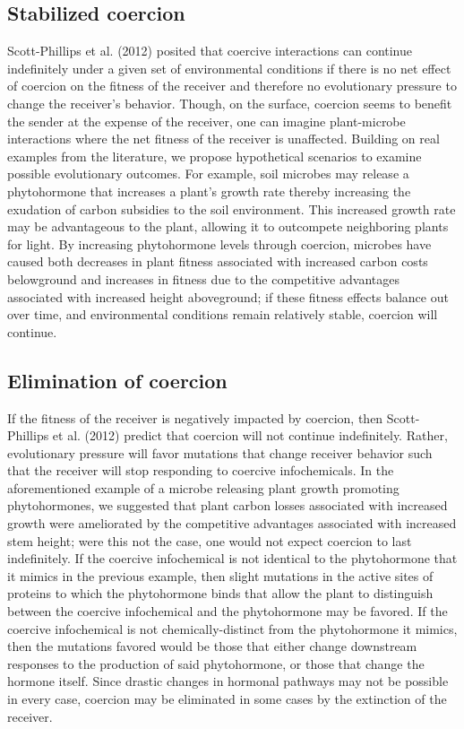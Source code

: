 \subsection{Stabilized coercion}
Scott-Phillips et al. (2012) posited that coercive interactions can continue indefinitely under a given set of environmental conditions if there is no net effect of coercion on the fitness of the receiver and therefore no evolutionary pressure to change the receiver’s behavior. Though, on the surface, coercion seems to benefit the sender at the expense of the receiver, one can imagine plant-microbe interactions where the net fitness of the receiver is unaffected. Building on real examples from the literature, we propose hypothetical scenarios to examine possible evolutionary outcomes. For example, soil microbes may release a phytohormone that increases a plant’s growth rate thereby increasing the exudation of carbon subsidies to the soil environment. This increased growth rate may be advantageous to the plant, allowing it to outcompete neighboring plants for light. By increasing phytohormone levels through coercion, microbes have caused both decreases in plant fitness associated with increased carbon costs belowground and increases in fitness due to the competitive advantages associated with increased height aboveground; if these fitness effects balance out over time, and environmental conditions remain relatively stable, coercion will continue.

\subsection{Elimination of coercion}
If the fitness of the receiver is negatively impacted by coercion, then Scott-Phillips et al. (2012) predict that coercion will not continue indefinitely. Rather, evolutionary pressure will favor mutations that change receiver behavior such that the receiver will stop responding to coercive infochemicals. In the aforementioned example of a microbe releasing plant growth promoting phytohormones, we suggested that plant carbon losses associated with increased growth were ameliorated by the competitive advantages associated with increased stem height; were this not the case, one would not expect coercion to last indefinitely. If the coercive infochemical is not identical to the phytohormone that it mimics in the previous example, then slight mutations in the active sites of proteins to which the phytohormone binds that allow the plant to distinguish between the coercive infochemical and the phytohormone may be favored. If the coercive infochemical is not chemically-distinct from the phytohormone it mimics, then the mutations favored would be those that either change downstream responses to the production of said phytohormone, or those that change the hormone itself. Since drastic changes in hormonal pathways may not be possible in every case, coercion may be eliminated in some cases by the extinction of the receiver. 

